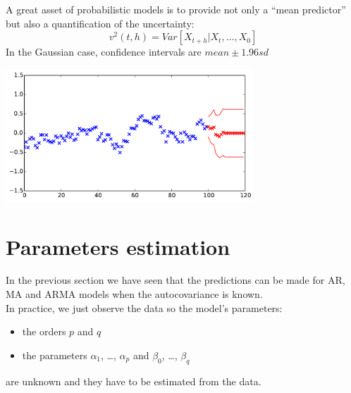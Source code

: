 \documentclass{beamer}
\begin{document}
\begin{frame}{}
A great asset of probabilistic models is to provide not only a ``mean predictor'' but also a quantification of the uncertainty:
\begin{equation*}
v^2(t,h) = Var[X_{t+h}|X_{t},\dots,X_0]
\end{equation*}
In the Gaussian case, confidence intervals are $mean \pm 1.96 sd$
\begin{center}
\includegraphics[height=5cm]{figures/1_mapredconf}
\end{center}
\end{frame}

\section{Parameters estimation}

\begin{frame}{}
In the previous section we have seen that the predictions can be made for AR, MA and ARMA models when the autocovariance is known.\\
\vspace{5mm}
In practice, we just observe the data so the model's parameters:
\begin{itemize}
	\item the orders $p$ and $q$ 
	\item the parameters $\alpha_1$, \dots, $\alpha_p$ and $\beta_0$, \dots, $\beta_q$
\end{itemize}
are unknown and they have to be estimated from the data.
\end{frame}
\end{document}
